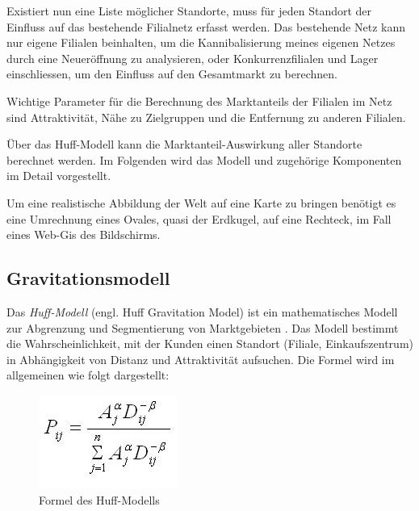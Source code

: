 Existiert nun eine Liste möglicher Standorte, muss für jeden Standort der Einfluss auf das bestehende Filialnetz erfasst werden.
Das bestehende Netz kann nur eigene Filialen beinhalten, um die Kannibalisierung meines eigenen Netzes durch eine Neueröffnung zu analysieren, oder Konkurrenzfilialen und Lager einschliessen, um den Einfluss auf den Gesamtmarkt zu berechnen.

Wichtige Parameter für die Berechnung des Marktanteils der Filialen im Netz sind Attraktivität, Nähe zu Zielgruppen und die Entfernung zu anderen Filialen.

Über das Huff-Modell kann die Marktanteil-Auswirkung aller Standorte berechnet werden.
Im Folgenden wird das Modell und zugehörige Komponenten im Detail vorgestellt.



Um eine realistische Abbildung der Welt auf eine Karte zu bringen benötigt es eine Umrechnung eines Ovales, quasi der Erdkugel, auf eine Rechteck, im Fall eines Web-Gis des Bildschirms. 
\subsection{Gravitationsmodell}
\label{subsec:gravitationmodel}
Das \textit{Huff-Modell} (engl. Huff Gravitation Model) ist ein mathematisches Modell zur Abgrenzung und Segmentierung von Marktgebieten \cite{Roy2004}.
Das Modell bestimmt die Wahrscheinlichkeit, mit der Kunden einen Standort (Filiale, Einkaufszentrum) in Abhängigkeit von Distanz und Attraktivität aufsuchen. 
Die Formel wird im allgemeinen wie folgt dargestellt:

\begin{figure}
	\centering
	\includegraphics[]{resources/images/huff_model.jpg}
	\caption{Formel des Huff-Modells}
	\label{img:huff_formula}
\end{figure}

